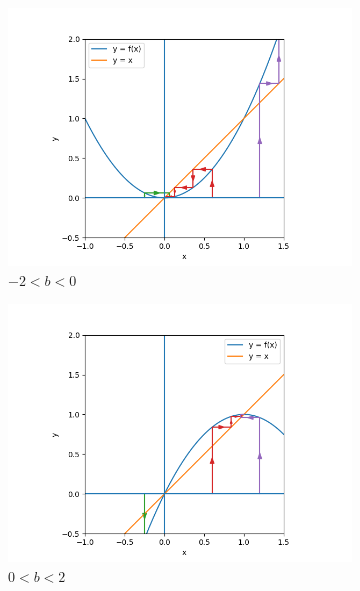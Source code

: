 \documentclass[nonumber]{homework}
\begin{document}
\begin{figure}[h]
\begin{subfigure}{.33\textwidth}
			\centering
			\includegraphics[width=\linewidth]{3.6 b gt -2.png}
			\caption{$-2 < b < 0$}
			\label{fig:3.6gt-2}
		\end{subfigure}
		\begin{subfigure}{.33\textwidth}
			\centering
			\includegraphics[width=\linewidth]{3.6 b gt 0.png}
			\caption{$0 < b < 2$}
			\label{fig:3.6gt0}
		\end{subfigure}
		\begin{subfigure}{.33\textwidth}
			\centering

\end{subfigure}
\end{figure}
\end{document}
